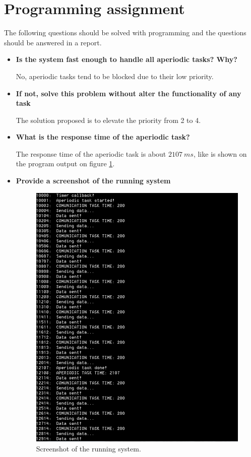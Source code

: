 \documentclass[12pt]{article}
\begin{document}
\section{Programming assignment}

The following questions should be solved with programming and the questions should be answered in a report.

\begin{itemize}
\item \textbf{Is the system fast enough to handle all aperiodic tasks? Why?}

No, aperiodic tasks tend to be blocked due to their low priority.

\item \textbf{If not, solve this problem without alter the functionality of any task}

The solution proposed is to elevate the priority from 2 to 4.

\item \textbf{What is the response time of the aperiodic task?}

The response time of the aperiodic task is about $2107\ ms$, like is shown on the program output on figure \ref{output}.

\item \textbf{Provide a screenshot of the running system}

\begin{figure}[h]
\centering
\includegraphics[scale=1]{figures/output}   
\caption{Screenshot of the running system.}
\label{output}
\end{figure}
\FloatBarrier

\end{itemize}
      
\end{document}

